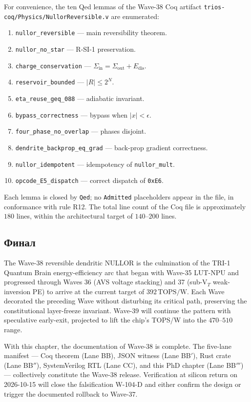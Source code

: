 For convenience, the ten Qed lemmas of the Wave-38 Coq artifact
\texttt{trios-coq/Physics/NullorReversible.v} are enumerated:
\begin{enumerate}
  \item \texttt{nullor\_reversible} --- main reversibility theorem.
  \item \texttt{nullor\_no\_star} --- R-SI-1 preservation.
  \item \texttt{charge\_conservation} --- $\Sigma_{\text{in}} =
    \Sigma_{\text{out}} + E_{\text{dis}}$.
  \item \texttt{reservoir\_bounded} --- $|R| \leq 2^N$.
  \item \texttt{eta\_reuse\_geq\_088} --- adiabatic invariant.
  \item \texttt{bypass\_correctness} --- bypass when $|x| < \epsilon$.
  \item \texttt{four\_phase\_no\_overlap} --- phases disjoint.
  \item \texttt{dendrite\_backprop\_eq\_grad} --- back-prop gradient
    correctness.
  \item \texttt{nullor\_idempotent} --- idempotency of \texttt{nullor\_mult}.
  \item \texttt{opcode\_E5\_dispatch} --- correct dispatch of \texttt{0xE6}.
\end{enumerate}

Each lemma is closed by \texttt{Qed}; no \texttt{Admitted} placeholders appear
in the file, in conformance with rule R12.  The total line count of the Coq
file is approximately $180$ lines, within the architectural target of
$140$--$200$ lines.

\subsection{Финал}
\label{subsec:final}

The Wave-38 reversible dendritic NULLOR is the culmination of the TRI-1 Quantum
Brain energy-efficiency arc that began with Wave-35 LUT-NPU and progressed
through Waves 36 (AVS voltage stacking) and 37 (sub-V$_T$ weak-inversion PE) to
arrive at the current target of $392\,\text{TOPS/W}$.  Each Wave decorated the
preceding Wave without disturbing its critical path, preserving the constitutional
layer-freeze invariant.  Wave-39 will continue the pattern with speculative
early-exit, projected to lift the chip's TOPS/W into the $470$--$510$ range.

With this chapter, the documentation of Wave-38 is complete.  The five-lane
manifest --- Coq theorem (Lane BB), JSON witness (Lane BB$'$), Rust crate (Lane
BB$''$), SystemVerilog RTL (Lane CC), and this PhD chapter (Lane BB$'''$) ---
collectively constitute the Wave-38 release.  Verification at silicon return on
2026-10-15 will close the falsification W-104-D and either confirm the design
or trigger the documented rollback to Wave-37.


